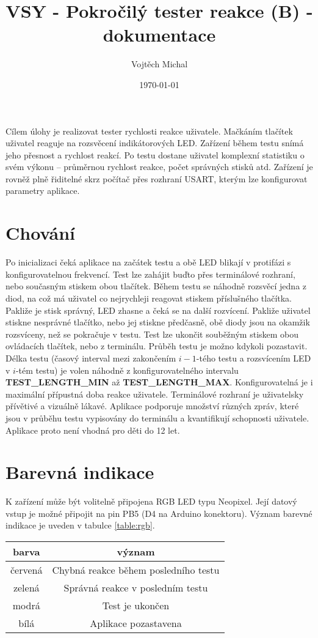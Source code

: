 \documentclass[twoside]{article}
\title{VSY - Pokročilý tester reakce (B) - dokumentace}
\author{Vojtěch Michal}
\date{\today}
\begin{document}
\maketitle

Cílem úlohy je realizovat tester rychlosti reakce uživatele. Mačkáním tlačítek uživatel reaguje na rozsvěcení indikátorových LED.
Zařízení během testu snímá jeho přesnost a rychlost reakcí. Po testu dostane uživatel komplexní statistiku o svém výkonu -- průměrnou
rychlost reakce, počet správných stisků atd. Zařízení je rovněž plně řiditelné skrz počítač přes rozhraní USART, kterým lze konfigurovat
parametry aplikace.

\section{Chování}
\label{sec:chovani}

Po inicializaci čeká aplikace na začátek testu a obě LED blikají v protifázi s konfigurovatelnou frekvencí.
Test lze zahájit buďto přes terminálové rozhraní, nebo současným stiskem obou tlačítek.
Během testu se náhodně rozsvěcí jedna z diod, na což má uživatel co nejrychleji reagovat stiskem příslušného tlačítka.
Pakliže je stisk správný, LED zhasne a čeká se na další rozvícení. Pakliže uživatel stiskne nesprávné tlačítko, nebo jej stiskne
předčasně, obě diody jsou na okamžik rozsvíceny, než se pokračuje v testu. Test lze ukončit souběžným stiskem obou
ovládacích tlačítek, nebo z terminálu. Průběh testu je možno kdykoli pozastavit.
Délka testu (časový interval mezi zakončením $i-1$-tého testu a rozsvícením LED v $i$-tém testu)
je volen náhodně z konfigurovatelného intervalu \textbf{TEST\_LENGTH\_MIN} až \textbf{TEST\_LENGTH\_MAX}.
Konfigurovatelná je i maximální přípustná doba reakce uživatele.
Terminálové rozhraní je uživatelsky přívětivé a vizuálně lákavé. Aplikace podporuje množství různých zpráv, které jsou 
v průběhu testu vypisovány do terminálu a kvantifikují schopnosti uživatele.
Aplikace proto není vhodná pro děti do 12 let.

\section{Barevná indikace}
K zařízení může být volitelně připojena RGB LED typu Neopixel. Její datový vstup je 
možné připojit na pin PB5 (D4 na Arduino konektoru). Význam barevné indikace je uveden
v tabulce \ref{table:rgb}. 

\begin{table}[htbp]
    \centering
    \begin{tabular}{c|c}
        barva & význam \\ \hline
        červená & Chybná reakce během posledního testu \\
        zelená & Správná reakce v posledním testu \\
        modrá &   Test je ukončen       \\
        bílá & Aplikace pozastavena
    \end{tabular}
\end{table}
\end{document}
